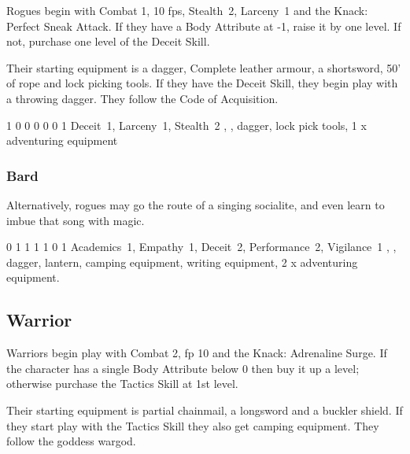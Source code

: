 {\begin{multicols}{2}
Rogues begin with Combat 1, 10 \glspl{fp}, Stealth~2, Larceny~1 and the Knack: Perfect Sneak Attack.
If they have a Body Attribute at -1, raise it by one level.
If not, purchase one level of the Deceit Skill.

Their starting equipment is a dagger, Complete leather armour, a shortsword, 50' of rope and lock picking tools.
If they have the Deceit Skill, they begin play with a throwing dagger.
They follow the Code of Acquisition.


{1}%
{0}%
{{0}%
{0}%
{0}}%
{0}%
{1}%
{Deceit~1, Larceny~1, Stealth~2\knacks{\perfectsneakattack}}%
{\longsword, \completeleather, dagger, lock pick tools, 1 x adventuring equipment}%
{\addtocounter{fp}{5}}

\subsubsection{Bard}

Alternatively, rogues may go the route of a singing socialite, and even learn to imbue that song with magic.


{0}%
{1}%
{{1}%
{1}%
{1}}%
{0}%
{1}%
{Academics~1, Empathy~1, Deceit~2, Performance~2, Vigilance~1
\knacks{\perfectsneakattack}
}%
{\longsword, \partialleather, dagger, lantern, camping equipment, writing equipment, 2 x adventuring equipment.
}%
{\addtocounter{fp}{5}}

\subsection{Warrior}

Warriors begin play with Combat 2, \gls{fp} 10 and the Knack: Adrenaline Surge.
If the character has a single Body Attribute below 0 then buy it up a level; otherwise purchase the Tactics Skill at 1st level.

Their starting equipment is partial chainmail, a longsword and a buckler shield.
If they start play with the Tactics Skill they also get camping equipment.
They follow the goddess \gls{wargod}.


\end{multicols}}

